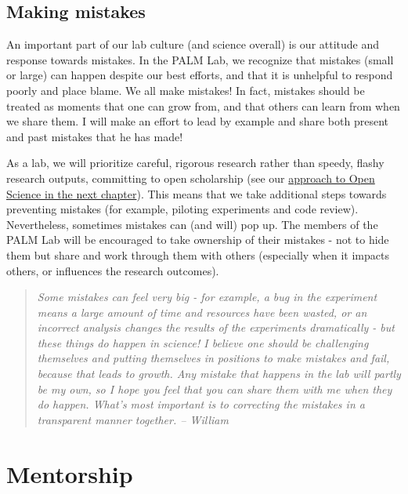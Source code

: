 \documentclass[
]{book}
\begin{document}
\hypertarget{making-mistakes}{%
\subsection*{Making mistakes}\label{making-mistakes}}

An important part of our lab culture (and science overall) is our attitude and response towards mistakes. In the PALM Lab, we recognize that mistakes (small or large) can happen despite our best efforts, and that it is unhelpful to respond poorly and place blame. We all make mistakes! In fact, mistakes should be treated as moments that one can grow from, and that others can learn from when we share them. I will make an effort to lead by example and share both present and past mistakes that he has made!

As a lab, we will prioritize careful, rigorous research rather than speedy, flashy research outputs, committing to open scholarship (see our \protect\hyperlink{open-science}{approach to Open Science in the next chapter}). This means that we take additional steps towards preventing mistakes (for example, piloting experiments and code review). Nevertheless, sometimes mistakes can (and will) pop up. The members of the PALM Lab will be encouraged to take ownership of their mistakes - not to hide them but share and work through them with others (especially when it impacts others, or influences the research outcomes).

\begin{quote}
\emph{Some mistakes can \emph{feel} very big - for example, a bug in the experiment means a large amount of time and resources have been wasted, or an incorrect analysis changes the results of the experiments dramatically - but these things do happen in science! I believe one should be challenging themselves and putting themselves in positions to make mistakes and fail, because that leads to growth. Any mistake that happens in the lab will partly be my own, so I hope you feel that you can share them with me when they do happen. What's most important is to correcting the mistakes in a transparent manner together. -- William}
\end{quote}

\hypertarget{lab-mentorship}{%
\section{Mentorship}\label{lab-mentorship}}
\end{document}

